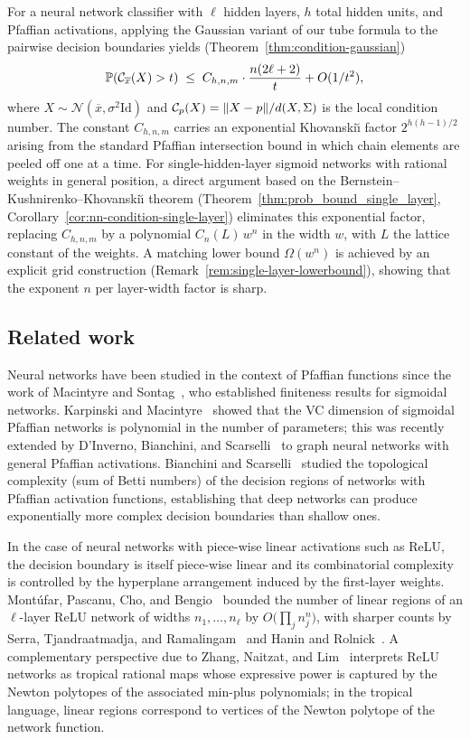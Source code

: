 For a neural network classifier with $\ell$ hidden layers, $h$ total hidden units, and Pfaffian activations, applying the Gaussian variant of our tube formula to the pairwise decision boundaries yields (Theorem~\ref{thm:condition-gaussian})
\begin{equation*}
  \mathbb{P}(\mathcal{C}_{\overline{x}}(X) > t) \;\leq\; C_{h,n,m}\cdot\frac{n(2\ell+2)}{t} + O(1/t^2),
\end{equation*}
where $X\sim\mathcal{N}(\overline{x}, \sigma^2\mathrm{Id})$ and $\mathcal{C}_p(X) = \|X-p\|/d(X,\Sigma)$ is the local condition number. The constant $C_{h,n,m}$ carries an exponential Khovanski\u\i{} factor $2^{h(h-1)/2}$ arising from the standard Pfaffian intersection bound in which chain elements are peeled off one at a time. For single-hidden-layer sigmoid networks with rational weights in general position, a direct argument based on the Bernstein--Kushnirenko--Khovanski\u\i{} theorem (Theorem~\ref{thm:prob_bound_single_layer}, Corollary~\ref{cor:nn-condition-single-layer}) eliminates this exponential factor, replacing $C_{h,n,m}$ by a polynomial $C_n(L)\,w^n$ in the width $w$, with $L$ the lattice constant of the weights. A matching lower bound $\Omega(w^n)$ is achieved by an explicit grid construction (Remark~\ref{rem:single-layer-lowerbound}), showing that the exponent $n$ per layer-width factor is sharp.

\subsection{Related work}
Neural networks have been studied in the context of Pfaffian functions since the work of Macintyre and Sontag~\cite{macintyre1993finiteness}, who established finiteness results for sigmoidal networks. Karpinski and Macintyre~\cite{karpinski1997polynomial} showed that the VC dimension of sigmoidal Pfaffian networks is polynomial in the number of parameters; this was recently extended by D'Inverno, Bianchini, and Scarselli~\cite{dinverno2024vc} to graph neural networks with general Pfaffian activations. Bianchini and Scarselli~\cite{bianchini2014complexity} studied the topological complexity (sum of Betti numbers) of the decision regions of networks with Pfaffian activation functions, establishing that deep networks can produce exponentially more complex decision boundaries than shallow ones.

In the case of neural networks with piece-wise linear activations such as ReLU, the decision boundary is itself piece-wise linear and its combinatorial complexity is controlled by the hyperplane arrangement induced by the first-layer weights. Mont\'ufar, Pascanu, Cho, and Bengio~\cite{montufar2014} bounded the number of linear regions of an $\ell$-layer ReLU network of widths $n_1, \ldots, n_\ell$ by $O\!\bigl(\prod_j n_j^n\bigr)$, with sharper counts by Serra, Tjandraatmadja, and Ramalingam~\cite{serra2018} and Hanin and Rolnick~\cite{hanin2019}. A complementary perspective due to Zhang, Naitzat, and Lim~\cite{zhang2018tropical} interprets ReLU networks as tropical rational maps whose expressive power is captured by the Newton polytopes of the associated min-plus polynomials; in the tropical language, linear regions correspond to vertices of the Newton polytope of the network function. 

